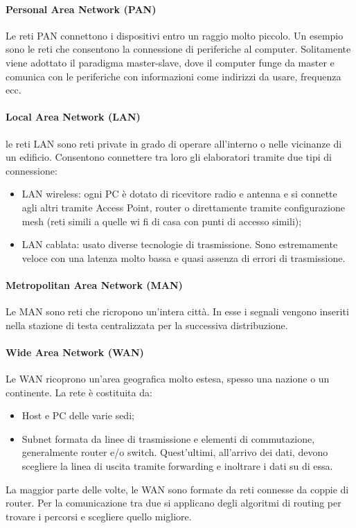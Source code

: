\documentclass{subfiles}
\begin{document}
    \paragraph{Personal Area Network (PAN)}
    Le reti PAN connettono i dispositivi entro un raggio molto piccolo. Un esempio sono le reti che consentono la connessione di 
    periferiche al computer. Solitamente viene adottato il paradigma master-slave, dove il computer funge da master e comunica con le 
    periferiche con informazioni come indirizzi da usare, frequenza ecc.

    \paragraph{Local Area Network (LAN)}
    le reti LAN sono reti private in grado di operare all'interno o nelle vicinanze di un edificio. Consentono connettere tra loro gli 
    elaboratori tramite due tipi di connessione:
    \begin{itemize}
        \item LAN wireless: ogni PC è dotato di ricevitore radio e antenna e si connette agli altri tramite Access Point, router o 
        direttamente tramite configurazione mesh (reti simili a quelle wi fi di casa con punti di accesso simili);
        \item LAN cablata: usato diverse tecnologie di trasmissione. Sono estremamente veloce con una latenza molto bassa e quasi 
        assenza di errori di trasmissione. 
    \end{itemize}

    \paragraph{Metropolitan Area Network (MAN)}
    Le MAN sono reti che ricropono un'intera città. In esse i segnali vengono inseriti nella stazione di testa centralizzata per la 
    successiva distribuzione.

    \paragraph{Wide Area Network (WAN)}
    Le WAN ricoprono un'area geografica molto estesa, spesso una nazione o un continente. La rete è costituita da:
    \begin{itemize}
        \item Host e PC delle varie sedi;
        \item Subnet formata da linee di trasmissione e elementi di commutazione, generalmente router e/o switch. Quest'ultimi, 
        all'arrivo dei dati, devono scegliere la linea di uscita tramite forwarding e inoltrare i dati su di essa.
    \end{itemize}
    La maggior parte delle volte, le WAN sono formate da reti connesse da coppie di router. Per la comunicazione tra due si applicano 
    degli algoritmi di routing per trovare i percorsi e scegliere quello migliore.
\end{document}
